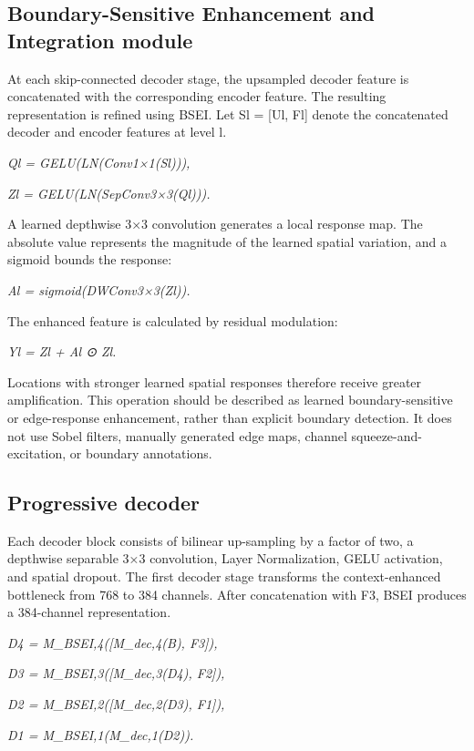 \subsection{Boundary-Sensitive Enhancement and Integration
module}\label{boundary-sensitive-enhancement-and-integration-module}

At each skip-connected decoder stage, the upsampled decoder feature is
concatenated with the corresponding encoder feature. The resulting
representation is refined using BSEI. Let Sl = {[}Ul, Fl{]} denote the
concatenated decoder and encoder features at level l.

\emph{Ql = GELU(LN(Conv1×1(Sl))),}

\emph{Zl = GELU(LN(SepConv3×3(Ql))).}

A learned depthwise 3×3 convolution generates a local response map. The
absolute value represents the magnitude of the learned spatial
variation, and a sigmoid bounds the response:

\emph{Al = sigmoid(\textbar DWConv3×3(Zl)\textbar).}

The enhanced feature is calculated by residual modulation:

\emph{Yl = Zl + Al ⊙ Zl.}

Locations with stronger learned spatial responses therefore receive
greater amplification. This operation should be described as learned
boundary-sensitive or edge-response enhancement, rather than explicit
boundary detection. It does not use Sobel filters, manually generated
edge maps, channel squeeze-and-excitation, or boundary annotations.

\subsection{Progressive decoder}\label{progressive-decoder}

Each decoder block consists of bilinear up-sampling by a factor of two,
a depthwise separable 3×3 convolution, Layer Normalization, GELU
activation, and spatial dropout. The first decoder stage transforms the
context-enhanced bottleneck from 768 to 384 channels. After
concatenation with F3, BSEI produces a 384-channel representation.

\emph{D4 = M\_BSEI,4({[}M\_dec,4(B), F3{]}),}

\emph{D3 = M\_BSEI,3({[}M\_dec,3(D4), F2{]}),}

\emph{D2 = M\_BSEI,2({[}M\_dec,2(D3), F1{]}),}

\emph{D1 = M\_BSEI,1(M\_dec,1(D2)).}

